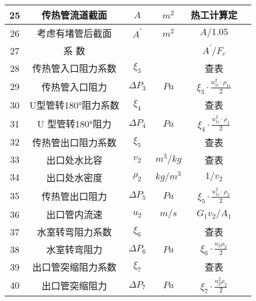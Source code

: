 \begin{table}[H]
{\begin{tabular}{|c|c|c|c|c|c|}
            25   & 传热管流道截面      & $ A $          & $ m^2 $    & 热工计算定                                               &      \\ \hline
            26   & 考虑有堵管后截面    & $ A^{'} $      & $ m^2 $    & $ A/1.05 $                                               &      \\ \hline
            27   & 系 数               &                &            & $ A^{'}/F_{c} $                                          &      \\ \hline
            28   & 传热管入口阻力系数  & $ \xi_3 $      &            & 查表                                                     &      \\ \hline
            29   & 传热管入口阻力      & $ \Delta P_3 $ & $ Pa $     & $ \xi_{3} \cdot \frac{u_{1 i}^{2} \cdot \rho_{1 i}}{2} $ &      \\ \hline
            30   & U型管转180°阻力系数 & $ \xi_4 $      &            & 查表                                                     &      \\ \hline
            31   & U 型管转180°阻力    & $ \Delta P_4 $ & $ Pa $     & $ \xi_{4} \cdot \frac{u_{1 i}^{2} \cdot \rho_{1 }}{2} $  &      \\ \hline
            32   & 传热管出口阻力系数  & $ \xi_5 $      &            & 查表                                                     &      \\ \hline
            33   & 出口处水比容        & $ v_2 $        & $ m^3/kg $ & 查表                                                     &      \\ \hline
            34   & 出口处水密度        & $ \rho_2 $     & $ kg/m^3 $ & $ 1/v_2 $                                                &      \\ \hline
            35   & 传热管出口阻力      & $ \Delta P_5 $ & $ Pa $     & $ \xi_{5} \cdot \frac{u_{1 i}^{2} \cdot \rho_{2 }}{2} $  &      \\ \hline
            36   & 出口管内流速        & $ u_2 $        & $ m/s $    & $ G_1v_2/A_1 $                                           &      \\ \hline
            37   & 水室转弯阻力系数    & $ \xi_6 $      &            & 查表                                                     &      \\ \hline
            38   & 水室转弯阻力        & $ \Delta P_6 $ & $ Pa $     & $ \xi_6 \cdot \frac{u_2 \rho_2}{2} $                     &      \\ \hline
            39   & 出口管突缩阻力系数  & $ \xi_7 $      &            & 查表                                                     &      \\ \hline
            40   & 出口管突缩阻力      & $ \Delta P_7 $ & $ Pa $     & $ \xi_7 \cdot \frac{u_{2}^{2} \rho_2}{2} $               &      \\ \hline
        \end{tabular}
    }
\end{table}

